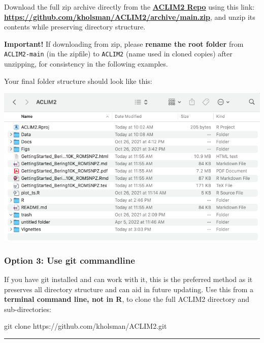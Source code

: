 \documentclass[
]{article}
\newenvironment{Shaded}{\begin{snugshade}}{\end{snugshade}}
\newcommand{\FunctionTok}[1]{\textcolor[rgb]{0.00,0.00,0.00}{#1}}
\newcommand{\NormalTok}[1]{#1}
\begin{document}
Download the full zip archive directly from the
\href{https://github.com/kholsman/ACLIM2}{\textbf{ACLIM2 Repo}} using
this link:
\href{https://github.com/kholsman/ACLIM2/archive/main.zip}{\textbf{https://github.com/kholsman/ACLIM2/archive/main.zip}},
and unzip its contents while preserving directory structure.

\textbf{Important!} If downloading from zip, please \textbf{rename the
root folder} from \texttt{ACLIM2-main} (in the zipfile) to
\texttt{ACLIM2} (name used in cloned copies) after unzipping, for
consistency in the following examples.

Your final folder structure should look like this:

\includegraphics[width=1\textwidth,height=\textheight]{Figs/ACLIM_dir.png}

\hypertarget{option-3-use-git-commandline}{%
\subsubsection{Option 3: Use git
commandline}\label{option-3-use-git-commandline}}

If you have git installed and can work with it, this is the preferred
method as it preserves all directory structure and can aid in future
updating. Use this from a \textbf{terminal command line, not in R}, to
clone the full ACLIM2 directory and sub-directories:

\begin{Shaded}
\begin{Highlighting}[]
    \FunctionTok{git}\NormalTok{ clone https://github.com/kholsman/ACLIM2.git}
\end{Highlighting}
\end{Shaded}

\begin{center}\rule{0.5\linewidth}{0.5pt}\end{center}
\end{document}
